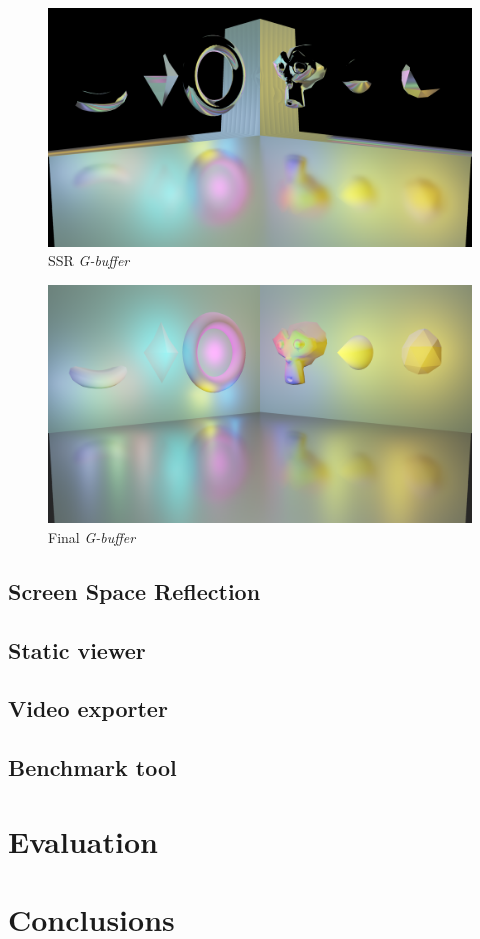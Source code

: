 \documentclass[11pt,a4paper]{report}
\begin{document}
\begin{figure}[htp]
	\centering
	\includegraphics[width=\textwidth]{deferred/07ssr.png}
	\caption{SSR \textit{G-buffer}}
	\label{deferred:ssr}
\end{figure}

\begin{figure}[htp]
	\centering
	\includegraphics[width=\textwidth]{deferred/08final.png}
	\caption{Final \textit{G-buffer}}
	\label{deferred:final}
\end{figure}

\section{Screen Space Reflection}

\section{Static viewer}

\section{Video exporter}

\section{Benchmark tool}

\chapter{Evaluation}

\chapter{Conclusions}
\end{document}
